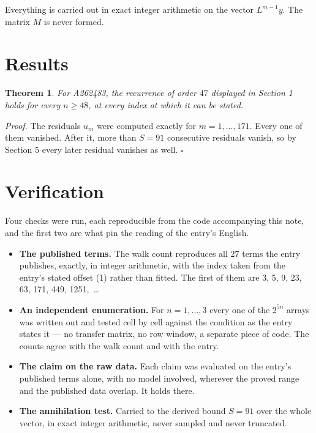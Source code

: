 \documentclass[11pt]{article}
\newtheorem{theorem}{Theorem}
\theoremstyle{definition}
\begin{document}
Everything is carried out in exact integer arithmetic on the vector $L^{m-1}y$. The matrix $M$ is never formed.

\section{Results}

\begin{theorem} For A262483, the recurrence of order $47$ displayed in Section 1 holds for every $n \ge 48$, at every index at which it can be stated.\end{theorem}

{\itshape Proof.} The residuals $u_m$ were computed exactly for $m = 1,\dots,171$. Every one of them vanished. After it, more than $S = 91$ consecutive residuals vanish, so by Section 5 every later residual vanishes as well. $\square$

\section{Verification}

Four checks were run, each reproducible from the code accompanying this note, and the first two are what pin the reading of the entry's English.

\begin{itemize}

\item {\bfseries The published terms.} The walk count reproduces all 27 terms the entry publishes, exactly, in integer arithmetic, with the index taken from the entry's stated offset (1) rather than fitted. The first of them are 3, 5, 9, 23, 63, 171, 449, 1251,~\dots

\item {\bfseries An independent enumeration.} For $n = 1,\dots,3$ every one of the $2^{5n}$ arrays was written out and tested cell by cell against the condition as the entry states it --- no transfer matrix, no row window, a separate piece of code. The counts agree with the walk count and with the entry.

\item {\bfseries The claim on the raw data.} Each claim was evaluated on the entry's published terms alone, with no model involved, wherever the proved range and the published data overlap. It holds there.

\item {\bfseries The annihilation test.} Carried to the derived bound $S = 91$ over the whole vector, in exact integer arithmetic, never sampled and never truncated.

\end{itemize}
\end{document}
